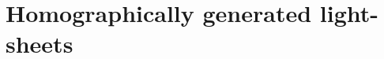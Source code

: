 \ifpdf
    \graphicspath{{Chapters/homography/Figs/Raster/}{Chapters/homography/Figs/PDF/}{Chapters/homography/Figs/}}
\else
    \graphicspath{{Chapters/homography/Figs/Vector/}{Chapters/homography/Figs/}}
\fi

\chapter{Homographically generated light-sheets}\label{chapter:homography}


